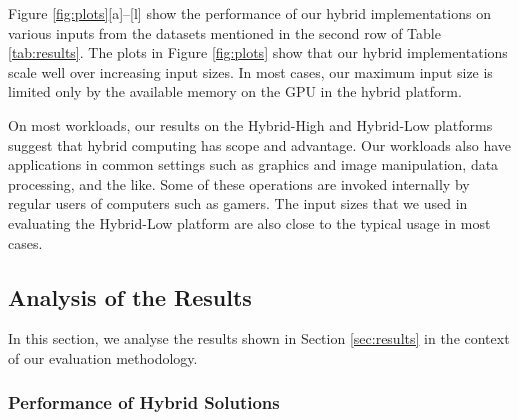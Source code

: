 \documentclass[11pt]{article}
\newcommand{\sgemm} {{\tt spgemm}}
\newcommand{\spmv} {{\tt spmv}}
\begin{document}
\begin{figure*}[htp]
\centering
{}
\subfigure[\spmv]{\texttt{[image: spmv.eps]}}
\hspace{.1in}
\hfill
\subfigure[\sgemm]{\texttt{[image: spmm.eps]}}
\hspace{.1in}
\hfill
{}
\hfill
{}
\caption{The plots show the performance improvement (in percentage) of
hybrid solutions over a pure GPU solution for the workloads considered
over various input sizes.}
\label{fig:plots}
\end{figure*}


Figure \ref{fig:plots}[a]--[l] show the performance of our hybrid
implementations on various inputs from the datasets mentioned in the
second row of Table \ref{tab:results}. 
The plots in Figure \ref{fig:plots} show that our hybrid implementations
scale well over increasing input sizes. In most cases, our maximum input 
size is limited only by the available memory on the GPU in the hybrid
platform. 

On most workloads, our results on the Hybrid-High and Hybrid-Low
platforms suggest that hybrid computing has scope and advantage.  Our
workloads also have applications in common settings such as graphics and
image manipulation, data processing, and the like. Some of these
operations are invoked internally by regular users of computers such as
gamers. The input sizes that we used in evaluating the Hybrid-Low
platform are also close to the typical usage in most cases. 

\subsection{Analysis of the Results}
In this section, we analyse the results shown in Section
\ref{sec:results} in the context of our evaluation methodology.

\subsubsection{Performance of Hybrid Solutions}
\end{document}
